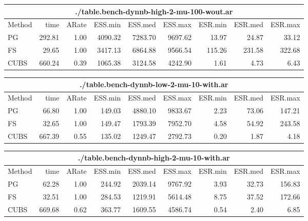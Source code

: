 \documentclass[11pt]{article}
\begin{document}
\begin{table}
\begin{tabular}{l r r r r r r r r } 
\hline
\multicolumn{9}{c}{./table.bench-dynnb-high-2-mu-100-wout.ar} \\
\hline
          Method  &     time &    ARate &  ESS.min &  ESS.med &  ESS.max &  ESR.min &  ESR.med &  ESR.max \\ 
              PG  &   292.81 &     1.00 &  4090.32 &  7283.70 &  9697.62 &    13.97 &    24.87 &    33.12 \\ 
              FS  &    29.65 &     1.00 &  3417.13 &  6864.88 &  9566.54 &   115.26 &   231.58 &   322.68 \\ 
            CUBS  &   660.24 &     0.39 &  1065.38 &  3124.58 &  4242.90 &     1.61 &     4.73 &     6.43
 \end{tabular}

\begin{tabular}{l r r r r r r r r } 
\hline
\multicolumn{9}{c}{./table.bench-dynnb-low-2-mu-10-with.ar} \\
\hline
          Method  &     time &    ARate &  ESS.min &  ESS.med &  ESS.max &  ESR.min &  ESR.med &  ESR.max \\ 
              PG  &    66.80 &     1.00 &   149.03 &  4880.10 &  9833.67 &     2.23 &    73.06 &   147.21 \\ 
              FS  &    32.65 &     1.00 &   149.47 &  1793.39 &  7952.70 &     4.58 &    54.92 &   243.58 \\ 
            CUBS  &   667.39 &     0.55 &   135.02 &  1249.47 &  2792.73 &     0.20 &     1.87 &     4.18
 \end{tabular}

\begin{tabular}{l r r r r r r r r } 
\hline
\multicolumn{9}{c}{./table.bench-dynnb-high-2-mu-10-with.ar} \\
\hline
          Method  &     time &    ARate &  ESS.min &  ESS.med &  ESS.max &  ESR.min &  ESR.med &  ESR.max \\ 
              PG  &    62.28 &     1.00 &   244.92 &  2039.14 &  9767.92 &     3.93 &    32.73 &   156.83 \\ 
              FS  &    32.51 &     1.00 &   284.53 &  1219.91 &  5614.48 &     8.75 &    37.52 &   172.66 \\ 
            CUBS  &   669.68 &     0.62 &   363.77 &  1609.55 &  4586.74 &     0.54 &     2.40 &     6.85
 \end{tabular}


\end{table}
\end{document}
